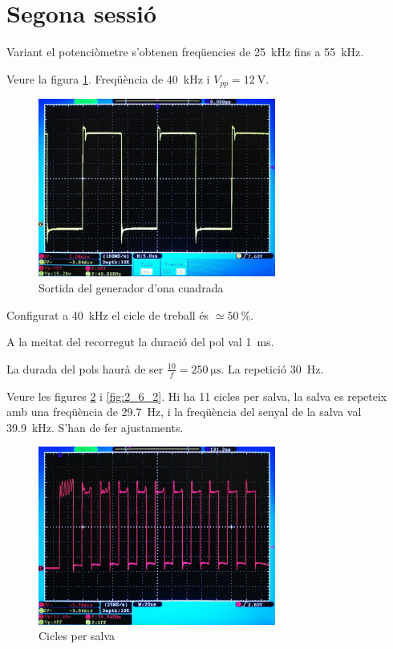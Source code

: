 \documentclass[catalan, a4paper, nobib]{tufte-handout}
\begin{document}
\part{Segona sessió}

 Variant el potenciòmetre s'obtenen freqüencies de \qty{25}{\kilo\hertz} fins a \qty{55}{\kilo\hertz}.

 Veure la figura \ref{fig:2_2}. Freqüència de \qty{40}{\kilo\hertz} i $V_{pp} = \qty{12}{\volt}$.

\begin{figure}
  \begin{center}
    \includegraphics[width=295px]{2_2.png}
  \end{center}
  \caption{Sortida del generador d'ona cuadrada}
  \label{fig:2_2}
\end{figure}

 Configurat a \qty{40}{\kilo\hertz} el cicle de treball és $\simeq\qty{50}{\percent}$.

 A la meitat del recorregut la duració del pol val \qty{1}{\milli\second}.

 La durada del pols haurà de ser $\frac{10}{f}=\qty{250}{\micro\second}$. La repetició \qty{30}{\hertz}.

 Veure les figures \ref{fig:2_6_1} i \ref{fig:2_6_2}. Hi ha \num{11} cicles per salva, la salva es repeteix amb una freqüència de \qty{29.7}{\hertz}, i la freqüència del senyal de la salva val \qty{39.9}{\kilo\hertz}. S'han de fer ajustaments.

\begin{figure}
  \begin{center}
    \includegraphics[width=295px]{2_6_1.png}
  \end{center}
  \caption{Cicles per salva}
  \label{fig:2_6_1}
\end{figure}
\end{document}
